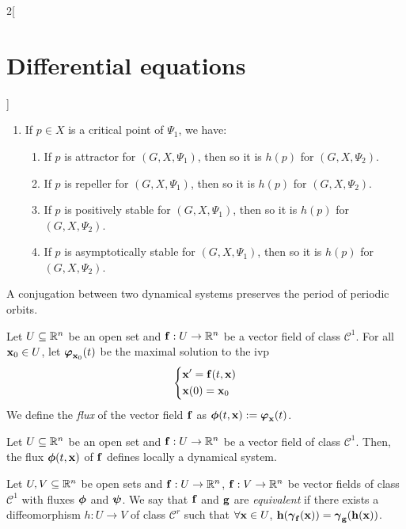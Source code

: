 \documentclass[../../../main.tex]{subfiles}
\begin{document}
\begin{multicols}{2}[\section{Differential equations}]
\begin{prop}
\begin{enumerate}
\begin{enumerate}
            \end{enumerate}
      \item If $p\in X$ is a critical point of $\Psi_1$, we have:
            \begin{enumerate}
              \item If $p$ is attractor for $(G,X,\Psi_1)$, then so it is $h(p)$ for $(G,X,\Psi_2)$.
              \item If $p$ is repeller for $(G,X,\Psi_1)$, then so it is $h(p)$ for $(G,X,\Psi_2)$.
              \item If $p$ is positively stable for $(G,X,\Psi_1)$, then so it is $h(p)$ for $(G,X,\Psi_2)$.
              \item If $p$ is asymptotically stable for $(G,X,\Psi_1)$, then so it is $h(p)$ for $(G,X,\Psi_2)$.
            \end{enumerate}
    \end{enumerate}
  \end{prop}
  \begin{prop}
    A conjugation between two dynamical systems preserves the period of periodic orbits.
  \end{prop}
  \begin{definition}
    Let $U\subseteq \mathbb{R}^n$ be an open set and $\boldsymbol{\mathrm{f}}:U\rightarrow\mathbb{R}^n$ be a vector field of class $\mathcal{C}^1$. For all $\boldsymbol{\mathrm{x}}_0\in U$, let $\boldsymbol{\mathrm{\varphi}}_{\boldsymbol{\mathrm{x}}_0}(t)$ be the maximal solution to the ivp
    $$\left\{
      \begin{aligned}
         & \boldsymbol{\mathrm{x}}'      =\boldsymbol{\mathrm{f}}(t,\boldsymbol{\mathrm{x}}) \\
         & \boldsymbol{\mathrm{x}}(0)  =\boldsymbol{\mathrm{x}}_0
      \end{aligned}
      \right.$$
    We define the \textit{flux} of the vector field $\boldsymbol{\mathrm{f}}$ as $\boldsymbol{\mathrm{\phi}}(t,\boldsymbol{\mathrm{x}}):=\boldsymbol{\mathrm{\varphi}}_{\boldsymbol{\mathrm{x}}}(t)$.
  \end{definition}
  \begin{prop}
    Let $U\subseteq \mathbb{R}^n$ be an open set and $\boldsymbol{\mathrm{f}}:U\rightarrow\mathbb{R}^n$ be a vector field of class $\mathcal{C}^1$. Then, the flux $\boldsymbol{\mathrm{\phi}}(t,\boldsymbol{\mathrm{x}})$ of $\boldsymbol{\mathrm{f}}$ defines locally a dynamical system.
  \end{prop}
  \begin{definition}
    Let $U,V\subseteq \mathbb{R}^n$ be open sets and $\boldsymbol{\mathrm{f}}:U\rightarrow\mathbb{R}^n$, $\boldsymbol{\mathrm{f}}:V\rightarrow\mathbb{R}^n$ be vector fields of class $\mathcal{C}^1$ with fluxes $\boldsymbol{\mathrm{\phi}}$ and $\boldsymbol{\mathrm{\psi}}$. We say that $\boldsymbol{\mathrm{f}}$ and $\boldsymbol{\mathrm{g}}$ are \textit{equivalent} if there exists a diffeomorphism $h:U\rightarrow V$ of class $\mathcal{C}^r$ such that $\forall \boldsymbol{\mathrm{x}}\in U$, $\boldsymbol{\mathrm{h}}(\boldsymbol{\mathrm{\gamma}}_{\boldsymbol{\mathrm{f}}}(\boldsymbol{\mathrm{x}}))=\boldsymbol{\mathrm{\gamma}}_{\boldsymbol{\mathrm{g}}}(\boldsymbol{\mathrm{h}}(\boldsymbol{\mathrm{x}}))$.

\end{definition}
\end{multicols}
\end{document}
